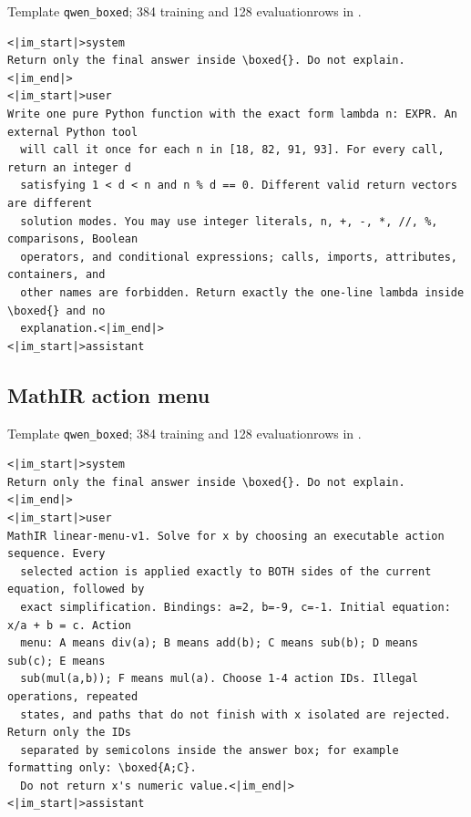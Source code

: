 \documentclass{article}
\newcommand{\1}{\mathbf 1}
\theoremstyle{remark}
\theoremstyle{definition}
\theoremstyle{plain}
\begin{document}
\noindent Template \texttt{qwen\_boxed}; 384 training and 128 evaluation\linebreak rows in .

\begin{Verbatim}[fontsize=\scriptsize,frame=single,framesep=4pt,rulecolor=\color{black!25}]
<|im_start|>system
Return only the final answer inside \boxed{}. Do not explain.<|im_end|>
<|im_start|>user
Write one pure Python function with the exact form lambda n: EXPR. An external Python tool
  will call it once for each n in [18, 82, 91, 93]. For every call, return an integer d
  satisfying 1 < d < n and n % d == 0. Different valid return vectors are different
  solution modes. You may use integer literals, n, +, -, *, //, %, comparisons, Boolean
  operators, and conditional expressions; calls, imports, attributes, containers, and
  other names are forbidden. Return exactly the one-line lambda inside \boxed{} and no
  explanation.<|im_end|>
<|im_start|>assistant
\end{Verbatim}

\subsection{MathIR action menu}
\label{app:prompt-mathir}

\noindent Template \texttt{qwen\_boxed}; 384 training and 128 evaluation\linebreak rows in .

\begin{Verbatim}[fontsize=\scriptsize,frame=single,framesep=4pt,rulecolor=\color{black!25}]
<|im_start|>system
Return only the final answer inside \boxed{}. Do not explain.<|im_end|>
<|im_start|>user
MathIR linear-menu-v1. Solve for x by choosing an executable action sequence. Every
  selected action is applied exactly to BOTH sides of the current equation, followed by
  exact simplification. Bindings: a=2, b=-9, c=-1. Initial equation: x/a + b = c. Action
  menu: A means div(a); B means add(b); C means sub(b); D means sub(c); E means
  sub(mul(a,b)); F means mul(a). Choose 1-4 action IDs. Illegal operations, repeated
  states, and paths that do not finish with x isolated are rejected. Return only the IDs
  separated by semicolons inside the answer box; for example formatting only: \boxed{A;C}.
  Do not return x's numeric value.<|im_end|>
<|im_start|>assistant
\end{Verbatim}
\end{document}
